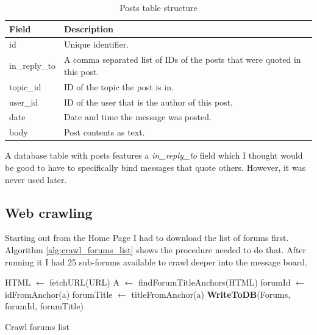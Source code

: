    \begin{table}[H]
      \begin{tabularx}{\textwidth}{|L{0.3}|L{1.7}|} \hline
         \textbf{Field} & \textbf{Description} \\\hline
        id & Unique identifier. \\
        in\_reply\_to & A comma separated list of IDs of the posts that were quoted in this post. \\
        topic\_id & ID of the topic the post is in. \\
        user\_id & ID of the user that is the author of this post. \\
        date & Date and time the message was posted. \\
        body & Post contents as text. \\\hline
      \end{tabularx}
      \caption{Posts table structure}
    \end{table}
    
    A database table with posts features a \emph{in\_reply\_to} field which I thought would be good to have to specifically bind messages that quote others. However, it was never used later.
    
  \subsection{Web crawling}
    \label{sec:crawling}
    
      Starting out from the Home Page I had to download the list of forums first. Algorithm \ref{alg:crawl_forums_list} shows the procedure needed to do that. After running it I had 25 sub-forums available to crawl deeper into the message board.
  
    \begin{algorithm}[H]
      \begin{algorithmic}[1]
          \State HTML $\gets$ fetchURL(URL)
          \State A $\gets$ findForumTitleAnchors(HTML)
            \State forumId $\gets$ idFromAnchor(a)
            \State forumTitle $\gets$ titleFromAnchor(a)
            \State \textbf{WriteToDB}(Forums, forumId, forumTitle)
          \EndFor
        \EndProcedure
      \end{algorithmic}
      \caption{Crawl forums list}
      \label{alg:crawl_forums_list}
    \end{algorithm}
    
